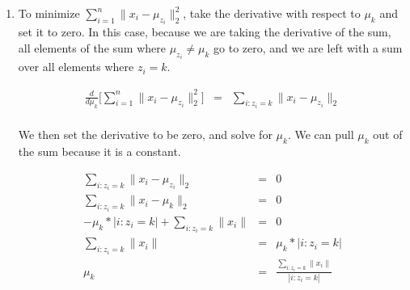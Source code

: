 \documentclass[12pt]{article}
\begin{document}
\begin{enumerate}[label=(\alph*)]
  \item To minimize $\sum_{i=1}^{n} \|x_i-\mu_{z_i}\|_2^2$, take the derivative with respect to $\mu_k$ and set it to zero. In this case, because we are taking the derivative of the sum, all elements of the sum where $\mu_{z_i} \ne \mu_k$ go to zero, and we are left with a sum over all elements where $z_i = k$.

  \begin{eqnarray*}
  \frac{d}{d\mu_k}\biggl[\sum_{i=1}^{n} \|x_i-\mu_{z_i}\|_2^2\biggr] &=& \sum_{i:z_i = k} \|x_i-\mu_{z_i}\|_2 \\
  \end{eqnarray*}

  We then set the derivative to be zero, and solve for $\mu_k$. We can pull $\mu_k$ out of the sum because it is a constant.

  \begin{eqnarray*}
  \sum_{i:z_i = k} \|x_i-\mu_{z_i}\|_2 &=& 0\\
  \sum_{i:z_i = k} \|x_i-\mu_k\|_2 &=& 0\\
  -\mu_k * |{i:z_i = k}| + \sum_{i:z_i = k} \|x_i\| &=& 0\\
  \sum_{i:z_i = k} \|x_i\| &=& \mu_k * |{i:z_i = k}|\\
  \mu_k &=& \frac{\sum_{i:z_i = k} \|x_i\|}{|{i:z_i = k}|}\\
  \end{eqnarray*}


\end{enumerate}
\end{document}

